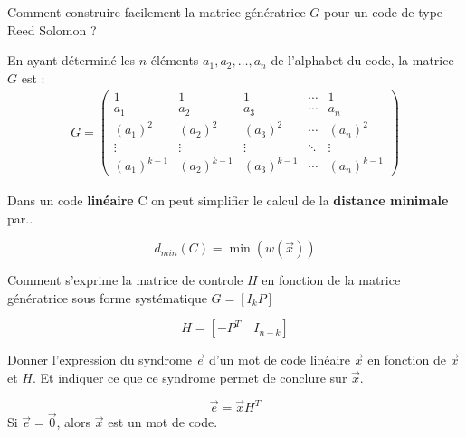 \documentclass[12pt]{article}
\newcommand*{\xfield}[1]{\begin{mdframed}\centering #1\end{mdframed}\bigskip}
\newenvironment{note}{}{}
\begin{document}
\begin{note}
	\xfield{Comment construire facilement la matrice génératrice $G$ pour un code de type Reed Solomon ?}
	\xfield{En ayant déterminé les $n$ éléments $a_1,a_2,\hdots,a_n$ de l'alphabet du code, la matrice $G$ est :
	\begin{align*}
	G = \begin{pmatrix}
	1 & 1 & 1 & \cdots & 1\\
	a_1 & a_2 & a_3 & \cdots & a_n\\
	(a_1)^2 & (a_2)^2 & (a_3)^2 & \cdots & (a_n)^2\\
	\vdots & \vdots & \vdots & \ddots & \vdots\\
	(a_1)^{k-1} & (a_2)^{k-1} & (a_3)^{k-1} & \cdots & (a_n)^{k-1}
	\end{pmatrix}
	\end{align*} }
\begin{note}
\xfield{Dans un code \textbf{linéaire} C on peut simplifier le calcul de la \textbf{distance minimale} par..}
\xfield{$$d_{min}(C) = \min(w(\vec{x}))$$}
\end{note}

\begin{note}
\xfield{Comment s'exprime la matrice de controle $H$ en fonction de la matrice génératrice sous forme systématique $G = [I_k P]$}
\xfield{$$H = [-P^T \hspace{1em} I_{n-k}]$$}
\end{note}

\begin{note}
\xfield{Donner l'expression du syndrome $\vec{e}$ d'un mot de code linéaire $\vec{x}$ en fonction de $\vec{x}$ et $H$. Et indiquer ce que ce syndrome permet de conclure sur $\vec{x}$.}
\xfield{
$$\vec{e} = \vec{x}H^T$$
Si $\vec{e} = \vec{0}$, alors $\vec{x}$ est un mot de code.
}
\end{note}
\end{document}
